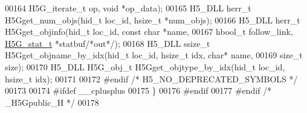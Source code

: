 \begin{DoxyCode}
00164         H5G\_iterate\_t op, \textcolor{keywordtype}{void} *op\_data);
00165 H5\_DLL herr\_t H5Gget\_num\_objs(hid\_t loc\_id, hsize\_t *num\_objs);
00166 H5\_DLL herr\_t H5Gget\_objinfo(hid\_t loc\_id, \textcolor{keyword}{const} \textcolor{keywordtype}{char} *name,
00167     hbool\_t follow\_link, \hyperlink{struct_h5_g__stat__t}{H5G\_stat\_t} *statbuf\textcolor{comment}{/*out*/});
00168 H5\_DLL ssize\_t H5Gget\_objname\_by\_idx(hid\_t loc\_id, hsize\_t idx, \textcolor{keywordtype}{char}* name,
00169     \textcolor{keywordtype}{size\_t} size);
00170 H5\_DLL H5G\_obj\_t H5Gget\_objtype\_by\_idx(hid\_t loc\_id, hsize\_t idx);
00171 
00172 \textcolor{preprocessor}{#endif }\textcolor{comment}{/* H5\_NO\_DEPRECATED\_SYMBOLS */}\textcolor{preprocessor}{}
00173 
00174 \textcolor{preprocessor}{#ifdef \_\_cplusplus}
00175 \}
00176 \textcolor{preprocessor}{#endif}
00177 \textcolor{preprocessor}{#endif }\textcolor{comment}{/* \_H5Gpublic\_H */}\textcolor{preprocessor}{}
00178 
\end{DoxyCode}
